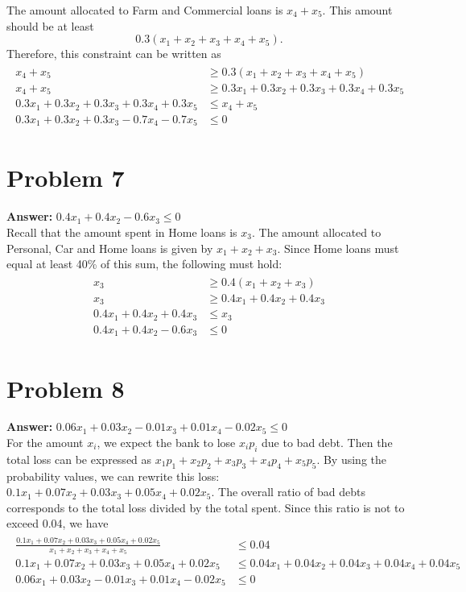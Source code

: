 \documentclass[11pt]{article}
\begin{document}
The amount allocated to Farm and Commercial loans is \(x_4+x_5\). This amount
should be at least
\begin{equation*}
0.3\left(x_1+x_2+x_3+x_4+x_5\right).
\end{equation*}
Therefore, this constraint can be written as
\begin{align}
  \begin{split}
    x_4+x_5&\geq 0.3\left(x_1+x_2+x_3+x_4+x_5\right)\\
    x_4+x_5&\geq 0.3x_1+0.3x_2+0.3x_3+0.3x_4+0.3x_5\\
    0.3x_1+0.3x_2+0.3x_3+0.3x_4+0.3x_5&\leq x_4+x_5\\
    0.3x_1+0.3x_2+0.3x_3-0.7x_4-0.7x_5&\leq 0
  \end{split}
\end{align}
\section*{Problem 7}
\label{sec:orgaba22a5}

\textbf{Answer:} \(0.4x_1+0.4x_2-0.6x_3\leq 0\)\\

Recall that the amount spent in Home loans is \(x_3\). The amount allocated to
Personal, Car and Home loans is given by \(x_1+x_2+x_3\). Since Home loans
must equal at least 40\% of this sum, the following must hold:
\begin{align}
  \begin{split}
    x_3&\geq 0.4\left(x_1+x_2+x_3\right)\\
    x_3&\geq 0.4x_1+0.4x_2+0.4x_3\\
    0.4x_1+0.4x_2+0.4x_3&\leq x_3\\
    0.4x_1+0.4x_2-0.6x_3&\leq 0
  \end{split}
\end{align}
\section*{Problem 8}
\label{sec:org80fa2fe}

\textbf{Answer:} \(0.06x_1+0.03x_2-0.01x_3+0.01x_4-0.02x_5\leq 0\)\\

For the amount \(x_i\), we expect the bank to lose \(x_i p_i\) due to bad
debt. Then the total loss can be expressed as \(x_1 p_1+x_2 p_2+x_3 p_3+x_4 p_4+x_5 p_5\).
By using the probability values, we can rewrite this loss: \(0.1x_1+0.07x_2+0.03x_3+0.05x_4+0.02x_5\).
The overall ratio of bad debts corresponds to the total loss divided by the
total spent. Since this ratio is not to exceed 0.04, we have
\begin{align}
  \begin{split}
    \frac{0.1x_1+0.07x_2+0.03x_3+0.05x_4+0.02x_5}{x_1+x_2+x_3+x_4+x_5}&\leq 0.04\\
    0.1x_1+0.07x_2+0.03x_3+0.05x_4+0.02x_5&\leq 0.04x_1+0.04x_2+0.04x_3+0.04x_4+0.04x_5\\
    0.06x_1+0.03x_2-0.01x_3+0.01x_4-0.02x_5&\leq 0
  \end{split}
\end{align}
\end{document}
